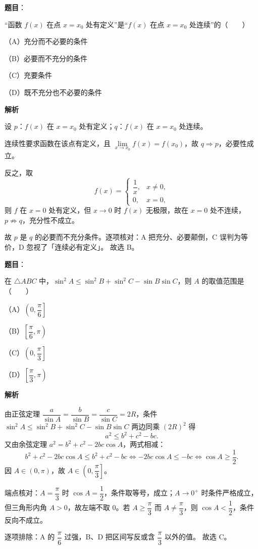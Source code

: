 \begin{answer}

\textbf{题目}：

“函数 $f(x)$ 在点 $x=x_0$ 处有定义”是“$f(x)$ 在点 $x=x_0$ 处连续”的\mbox{（　　）}

（A）充分而不必要的条件

（B）必要而不充分的条件

（C）充要条件

（D）既不充分也不必要的条件

\textbf{解析}

设 $p$：$f(x)$ 在 $x=x_0$ 处有定义；$q$：$f(x)$ 在 $x=x_0$ 处连续。

连续性要求函数在该点有定义，且 $\lim\limits_{x\to x_0}f(x)=f(x_0)$，故 $q\Rightarrow p$，必要性成立。

反之，取
\nopagebreak[4]
\[f(x)=\begin{cases}\dfrac1x,&x\neq0,\\[2pt] 0,&x=0,\end{cases}\]
则 $f$ 在 $x=0$ 处有定义，但 $x\to0$ 时 $f(x)$ 无极限，故在 $x=0$ 处不连续，$p\not\Rightarrow q$，充分性不成立。

故 $p$ 是 $q$ 的必要而不充分条件。逐项核对：A 把充分、必要颠倒，C 误判为等价，D 忽视了「连续必有定义」。
故选 B。


\end{answer}
\begin{answer}

\textbf{题目}：

在 $\triangle ABC$ 中，$\sin^2A\leqslant\sin^2B+\sin^2C-\sin B\sin C$，则 $A$ 的取值范围是\mbox{（　　）}

（A）$\left(0,\dfrac{\pi}{6}\right]$

（B）$\left[\dfrac{\pi}{6},\pi\right)$

（C）$\left(0,\dfrac{\pi}{3}\right]$

（D）$\left[\dfrac{\pi}{3},\pi\right)$

\textbf{解析}

由正弦定理 $\dfrac{a}{\sin A}=\dfrac{b}{\sin B}=\dfrac{c}{\sin C}=2R$，条件 $\sin^2A\leqslant\sin^2B+\sin^2C-\sin B\sin C$ 两边同乘 $(2R)^2$ 得
\nopagebreak[4]
\[a^2\leqslant b^2+c^2-bc.\]
又由余弦定理 $a^2=b^2+c^2-2bc\cos A$，两式相减：
\nopagebreak[4]
\[b^2+c^2-2bc\cos A\leqslant b^2+c^2-bc\iff -2bc\cos A\leqslant-bc\iff\cos A\geqslant\frac12.\]
因 $A\in(0,\pi)$，故 $A\in\left(0,\dfrac{\pi}{3}\right]$。

端点核对：$A=\dfrac{\pi}{3}$ 时 $\cos A=\dfrac12$，条件取等号，成立；$A\to0^+$ 时条件严格成立，但三角形内角 $A>0$，故左端不取 $0$。若 $A\geqslant\dfrac{\pi}{3}$ 而 $A\neq\dfrac{\pi}{3}$，则 $\cos A<\dfrac12$，条件反向不成立。

逐项排除：A 的 $\dfrac{\pi}{6}$ 过强，B、D 把区间写反或含 $\dfrac{\pi}{3}$ 以外的值。
故选 C。


\end{answer}
